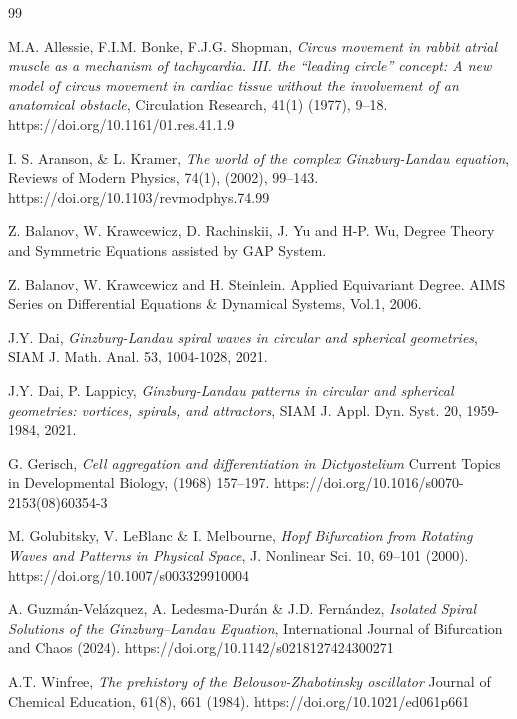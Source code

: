 \documentclass[11pt]{amsart}
\begin{document}
\begin{thebibliography}{99}

 M.A. Allessie, F.I.M. Bonke, F.J.G. Shopman, \emph{Circus movement in rabbit atrial muscle as a mechanism of tachycardia. III. the “leading circle” concept: A new model of circus movement in cardiac tissue without the involvement of an anatomical obstacle}, Circulation Research, 41(1) (1977), 9–18. https://doi.org/10.1161/01.res.41.1.9 

 I. S.  Aranson, \& L. Kramer, \emph{The world of the complex Ginzburg-Landau equation}, Reviews of Modern Physics, 74(1), (2002), 99–143. https://doi.org/10.1103/revmodphys.74.99


 Z. Balanov, W. Krawcewicz, D. Rachinskii, J. Yu and  H-P.  {\sf Wu, Degree Theory and Symmetric Equations assisted by GAP System}. 

 \textrm{Z. Balanov, W. Krawcewicz and H. Steinlein.}  {\sf Applied Equivariant Degree}. AIMS Series on Differential Equations \& Dynamical Systems, Vol.1, 2006.


 J.Y. Dai, \emph{Ginzburg-Landau spiral waves in circular and spherical geometries}, SIAM J. Math. Anal. 53, 1004-1028, 2021.

 J.Y. Dai, P. Lappicy, \emph{Ginzburg-Landau patterns in circular and spherical geometries: vortices, spirals, and attractors}, SIAM J. Appl. Dyn. Syst. 20, 1959-1984, 2021.

G. Gerisch, \emph{Cell aggregation and differentiation in Dictyostelium} Current Topics in Developmental Biology, (1968) 157–197. https://doi.org/10.1016/s0070-2153(08)60354-3 

  M. Golubitsky, V. LeBlanc \& I. Melbourne, \emph{Hopf Bifurcation from Rotating Waves and Patterns in Physical Space}, J. Nonlinear Sci. 10, 69–101 (2000). https://doi.org/10.1007/s003329910004

 A. Guzmán-Velázquez, A. Ledesma-Durán \& J.D. Fernández, \emph{Isolated Spiral Solutions of the Ginzburg–Landau Equation}, International Journal of Bifurcation and Chaos (2024). https://doi.org/10.1142/s0218127424300271


 A.T. Winfree, \emph{The prehistory of the Belousov-Zhabotinsky oscillator} Journal of Chemical Education, 61(8), 661 (1984). https://doi.org/10.1021/ed061p661 

\end{thebibliography} 
\end{document}
